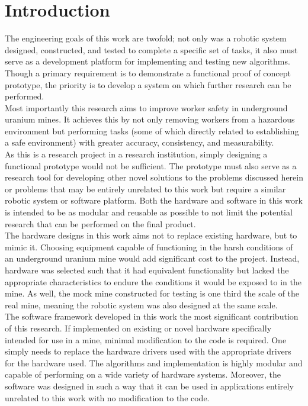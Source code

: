 \chapter{Introduction}
\label{chap:introduction}

The engineering goals of this work are twofold; not only was a robotic system designed, constructed, and tested to complete a specific set of tasks, it also must serve as a development platform for implementing and testing new algorithms. Though a primary requirement is to demonstrate a functional proof of concept prototype, the priority is to develop a system on which further research can be performed.\\

Most importantly this research aims to improve worker safety in underground uranium mines. It achieves this by not only removing workers from a hazardous environment but performing tasks (some of which directly related to establishing a safe environment) with greater accuracy, consistency, and measurability.\\

As this is a research project in a research institution, simply designing a functional prototype would not be sufficient. The prototype must also serve as a research tool for developing other novel solutions to the problems discussed herein or problems that may be entirely unrelated to this work but require a similar robotic system or software platform. Both the hardware and software in this work is intended to be as modular and reusable as possible to not limit the potential research that can be performed on the final product.\\

The hardware designs in this work aims not to replace existing hardware, but to mimic it. Choosing equipment capable of functioning in the harsh conditions of an underground uranium mine would add significant cost to the project. Instead, hardware was selected such that it had equivalent functionality but lacked the appropriate characteristics to endure the conditions it would be exposed to in the mine. As well, the mock mine constructed for testing is one third the scale of the real mine, meaning the robotic system was also designed at the same scale.\\

The software framework developed in this work the most significant contribution of this research. If implemented on existing or novel hardware specifically intended for use in a mine, minimal modification to the code is required. One simply needs to replace the hardware drivers used with the appropriate drivers for the hardware used. The algorithms and implementation is highly modular and capable of performing on a wide variety of hardware systems. Moreover, the software was designed in such a way that it can be used in applications entirely unrelated to this work with no modification to the code.\\

